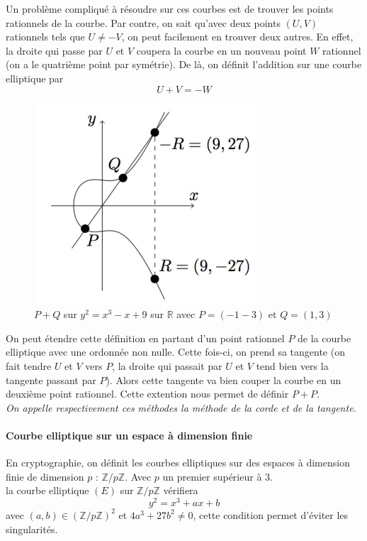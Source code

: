 \documentclass[a4paper, 12pt]{article}
\begin{document}
\label{methodecorde}Un problème compliqué à résoudre sur ces courbes est de trouver les points rationnels de la courbe. Par contre, on sait qu'avec deux points $(U, V)$ rationnels tels que $U \neq -V$, on peut facilement en trouver deux autres. En effet, la droite qui passe par $U$ et $V$ coupera la courbe en un nouveau point $W$ rationnel (on a le quatrième point par symétrie).
De là, on définit l'addition sur une courbe elliptique par 
$$
U + V = - W
$$

\begin{figure}[h]
	\centering
	\includegraphics[width=.5\textwidth]{img/courbe1op.png}
	\caption{$P + Q$ sur $y^2 = x^3 - x + 9$ sur $\mathbb{R}$ avec $P = (-1-3)$ et $Q = (1,3)$}
	\label{courbe1op}
\end{figure}


\label{methodetangente}On peut étendre cette définition en partant d'un point rationnel $P$ de la courbe elliptique avec une ordonnée non nulle. Cette fois-ci, on prend sa tangente (on fait tendre $U$ et $V$ vers $P$, la droite qui passait par $U$ et $V$ tend bien vers la tangente passant par $P$). Alors cette tangente va bien couper la courbe en un deuxième point rationnel. Cette extention nous permet de définir $P+P$. \\

\noindent\emph{On appelle respectivement ces méthodes la méthode de la corde et de la tangente.}

\paragraph{Courbe elliptique sur un espace à dimension finie}
En cryptographie, on définit les courbes elliptiques sur des espaces à dimension finie de dimension $p$ : $\mathbb{Z}/p\mathbb{Z}$. Avec $p$ un premier supérieur à 3. \\
la courbe elliptique $(E)$ sur $ \mathbb{Z}/p\mathbb{Z}$ vérifiera 
$$
y^2 = x^3 + ax + b
$$
avec $(a,b) \in \left(\mathbb{Z}/p\mathbb{Z}\right)^2$ et $4a^3 + 27b^2 \neq 0$, cette condition permet d'éviter les singularités. \\
\end{document}
